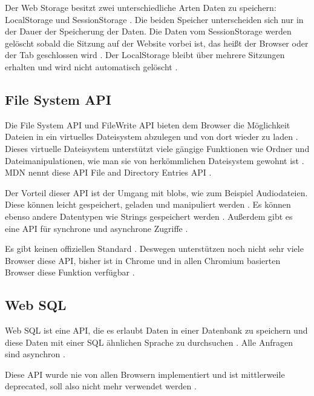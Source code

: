 Der Web Storage besitzt zwei unterschiedliche Arten Daten zu speichern: LocalStorage und SessionStorage \autocite{Hajian2019} \autocite{mdn-web-storage}. Die beiden Speicher unterscheiden sich nur in der Dauer der Speicherung der Daten. Die Daten vom SessionStorage werden gelöscht sobald die Sitzung auf der Website vorbei ist, das heißt der Browser oder der Tab geschlossen wird \autocite{Hajian2019} \autocite{mdn-web-storage}. Der LocalStorage bleibt über mehrere Sitzungen erhalten und wird nicht automatisch gelöscht \autocite{Hajian2019} \autocite{mdn-web-storage}.

\subsection{File System API}
Die File System \ac{API} und FileWrite \ac{API} bieten dem Browser die Möglichkeit Dateien in ein virtuelles Dateisystem abzulegen und von dort wieder zu laden \autocite{Hajian2019} \autocite{storage-for-the-web}. Dieses virtuelle Dateisystem unterstützt viele gängige Funktionen wie Ordner und Dateimanipulationen, wie man sie von herkömmlichen Dateisystem gewohnt ist \autocite{mdn-file-system}. \ac{MDN} nennt diese \ac{API} File and Directory Entries \ac{API} \autocite{mdn-file-system}. 

Der Vorteil dieser \ac{API} ist der Umgang mit \acp{blob}, wie zum Beispiel Audiodateien. Diese können leicht gespeichert, geladen und manipuliert werden \autocite{mdn-file-system}. Es können ebenso andere Datentypen wie Strings gespeichert werden \autocite{mdn-file-system}. Außerdem gibt es eine \ac{API} für synchrone und asynchrone Zugriffe \autocite{Hajian2019}. 

Es gibt keinen offiziellen Standard \autocite{mdn-file-system} \autocite{caniuse-filesystem}. Deswegen unterstützen noch nicht sehr viele Browser diese \ac{API}, bisher ist in Chrome und in allen Chromium basierten Browser diese Funktion verfügbar \autocite{caniuse-filesystem}.

\subsection{Web SQL}
Web SQL ist eine \ac{API}, die es erlaubt Daten in einer Datenbank zu speichern und diese Daten mit einer SQL ähnlichen Sprache zu durchsuchen \autocite{w3-web-sql}. Alle Anfragen sind asynchron \autocite{Hajian2019}.

Diese \ac{API} wurde nie von allen Browsern implementiert und ist mittlerweile deprecated, soll also nicht mehr verwendet werden \autocite{Hajian2019}.

